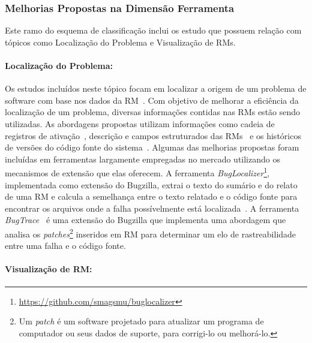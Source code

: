 

\subsubsection{Melhorias Propostas na Dimensão Ferramenta}
\label{ssub:melhorias_dim_ferramenta}

Este ramo do esquema de classificação inclui os estudo que possuem relação com
tópicos como Localização do Problema e Visualização de RMs.

\paragraph{Localização do Problema:}

Os estudos incluídos neste tópico focam em localizar a origem de um problema de
software com base nos dados da RM~\cite{Hovemeyer:2004:FBE:1052883.1052895}.
Com objetivo de melhorar a eficiência da localização de um problema, diversas
informações contidas nas RMs estão sendo utilizadas. As abordagens propostas
utilizam informações como cadeia de registros de
ativação~\cite{Wong:2014:BBF:2705615.2706096}, des\-cri\-ção e campos
estruturados das RMs~\cite{Thung:2014:BIT:2635868.2661678} e os históricos de
versões do código fonte do
sistema~\cite{Bangcharoensap:2012:LSC:2419061.2419428, corley2011recovering,
    Romo:2015:TAT:2745802.2745833}. Algumas das melhorias propostas foram
incluídas em ferramentas largamente empregadas no mercado utilizando os
mecanismos de extensão que elas oferecem. A ferramenta
\textit{BugLocalizer}\footnote{\url{https://github.com/smagsmu/buglocalizer}},
implementada como extensão do Bugzilla, extrai o texto do sumário e do relato
de uma RM e calcula a semelhança entre o texto relatado e o código fonte para
encontrar os arquivos onde a falha possívelmente está
localizada~\cite{Thung:2014:BIT:2635868.2661678}. A ferramenta
\textit{BugTrace}~\cite{corley2011recovering} é uma extensão do Bugzilla que
implementa uma abordagem que analisa os \textit{patches}\footnote{Um
    \textit{patch} é um software projetado para atualizar um programa de
    computador ou seus dados de suporte, para corrigi-lo ou melhorá-lo.}
inseridos em RM para determinar um elo de rastreabilidade entre uma falha e o
código fonte.

\paragraph{Visualização de RM:}

